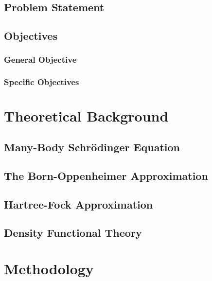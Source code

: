 \documentclass[12pt, titlepage, twoside, openright, usernames, dvipsnames]{thesis}
\theoremstyle{definition}
\theoremstyle{definition}
\begin{document}
  \section{Problem Statement}\label{Problem Statement}


  \section{Objectives}\label{Objectives}
  
  \subsection{General Objective}\label{General Objective}

  \subsection{Specific Objectives}\label{Specific Objectives}



\chapter{Theoretical Background}\label{Theoretical Background}

\section{Many-Body Schrödinger Equation}\label{Many Body Schrödinger Equation}

\section{The Born-Oppenheimer Approximation}\label{The Born-Oppenheimer Approximation}

\section{Hartree-Fock Approximation}\label{Hartree-Fock Approximation}

\section{Density Functional Theory}\label{Density Functional Theory}



\chapter{Methodology}\label{Methodology}






\printglossary[type=\acronymtype, title={Abbreviations}]
\end{document}
